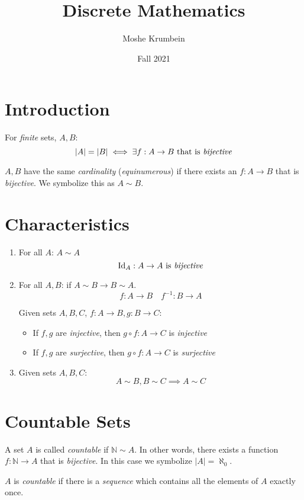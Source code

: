 \documentclass[00_complete]{subfiles}
\title{Discrete Mathematics}
\author{Moshe Krumbein}
\date{Fall 2021}
\begin{document}

\section{Introduction}
\begin{reminder}
    For \emph{finite} sets, $A,B$:
    $$|A|=|B| \iff \exists f:A\to B \text{ that is \emph{bijective}}$$
\end{reminder}
\begin{definition}[Equinumerosity]
    $A, B$ have the same \emph{cardinality} (\emph{equinumerous}) if there
    exists an $f:A\to B$ that is \emph{bijective}. We symbolize this as $A\sim
    B$.
\end{definition}
\section{Characteristics}
\begin{enumerate}
    \item For all $A$: $A \sim A$
    $$\operatorname{Id}_A:A\to A \text{ is \emph{bijective}}$$

    \item For all $A,B$: if $A \sim B \to B \sim A$.
    $$f:A \to B \quad f^{-1}: B \to A$$
\begin{claim}
    Given sets $A,B,C$, $f:A\to B, g:B \to C$:
    \begin{itemize}
        \item If $f,g$ are \emph{injective}, then $g \circ f: A \to C$ is
            \emph{injective}
        \item If $f,g$ are \emph{surjective}, then $g \circ f:A \to C$ is
            \emph{surjective}
    \end{itemize}
\end{claim}
    \item Given sets $A,B,C$:
        $$A \sim B, B \sim C \implies A \sim C$$
\end{enumerate}
\section{Countable Sets}
\begin{definition}
    A set $A$ is called \emph{countable} if $\mathbb{N} \sim A$. In other
    words, there exists a function $f: \mathbb{N} \to A$ that is
    \emph{bijective}. In this case we symbolize $|A|=\aleph_0$.
\end{definition}
\begin{note}
    $A$ is \emph{countable} if there is a \emph{sequence} which contains all
    the elements of $A$ exactly once.
\end{note}
\end{document}
